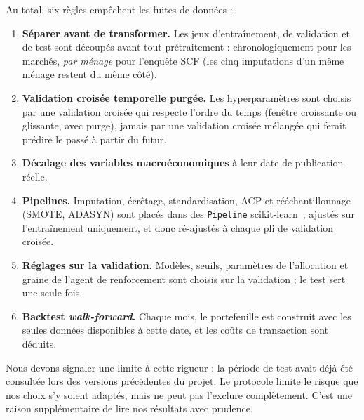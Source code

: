 Au total, six règles empêchent les fuites de données :
\begin{enumerate}
  \item \textbf{Séparer avant de transformer.} Les jeux d'entraînement, de validation et de test sont découpés avant tout prétraitement : chronologiquement pour les marchés, \emph{par ménage} pour l'enquête SCF (les cinq imputations d'un même ménage restent du même côté).
  \item \textbf{Validation croisée temporelle purgée.} Les hyperparamètres sont choisis par une validation croisée qui respecte l'ordre du temps (fenêtre croissante ou glissante, avec purge), jamais par une validation croisée mélangée qui ferait prédire le passé à partir du futur.
  \item \textbf{Décalage des variables macroéconomiques} à leur date de publication réelle.
  \item \textbf{Pipelines.} Imputation, écrêtage, standardisation, ACP et rééchantillonnage (SMOTE, ADASYN) sont placés dans des \texttt{Pipeline} scikit-learn~\cite{pedregosa2011}, ajustés sur l'entraînement uniquement, et donc ré-ajustés à chaque pli de validation croisée.
  \item \textbf{Réglages sur la validation.} Modèles, seuils, paramètres de l'allocation et graine de l'agent de renforcement sont choisis sur la validation ; le test sert une seule fois.
  \item \textbf{Backtest \emph{walk-forward}.} Chaque mois, le portefeuille est construit avec les seules données disponibles à cette date, et les coûts de transaction sont déduits.
\end{enumerate}

Nous devons signaler une limite à cette rigueur : la période de test avait déjà été consultée lors des versions précédentes du projet. Le protocole limite le risque que nos choix s'y soient adaptés, mais ne peut pas l'exclure complètement. C'est une raison supplémentaire de lire nos résultats avec prudence.

